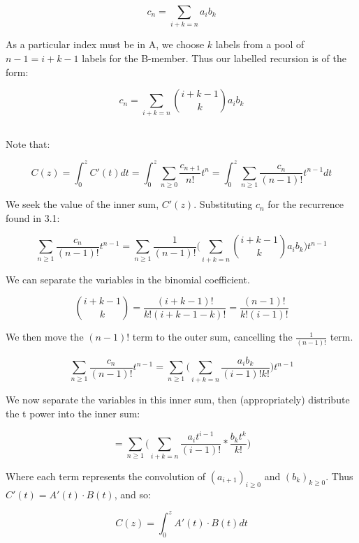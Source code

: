 \documentclass{article}
\begin{document}
$$c_n = \sum_{i + k = n} a_ib_k$$

As a particular index must be in A, we choose $k$ labels from a pool of $n-1 = i + k - 1$ labels for the B-member. Thus our labelled recursion is of the form:

$$c_n = \sum_{i + k = n} \binom{i + k - 1}{k}a_ib_k$$

\subsection{}

Note that:

$$C(z) =  \int_{0}^{z} C'(t) dt = \int_{0}^{z} \sum_{n \ge 0} \frac{c_{n+1}}{n!}t^{n}  = \int_{0}^{z} \sum_{n \ge 1} \frac{c_n}{(n-1)!}t^{n-1}  dt$$ 

We seek the value of the inner sum, $C'(z)$. Substituting $c_n$ for the recurrence found in 3.1:

$$\sum_{n \ge 1}\frac{c_n}{(n-1)!}t^{n-1}  = \sum_{n \ge 1}\frac{1}{(n-1)!} \bigg( \sum_{i + k = n} \binom{i + k - 1}{k}a_ib_k\bigg)t^{n-1}$$

We can separate the variables in the binomial coefficient.

$$\binom{i + k - 1}{k} = \frac{(i+k-1)!}{k!(i + k - 1 - k)!} = \frac{(n-1)!}{k!(i-1)!} $$

We then move the $(n-1)!$ term to the outer sum, cancelling the $\frac{1}{(n-1)!}$ term.

$$\sum_{n \ge 1}\frac{c_n}{(n-1)!}t^{n-1}  = \sum_{n \ge 1} \bigg( \sum_{i + k = n} \frac{a_ib_k}{(i-1)!k!}\bigg)t^{n-1}$$

We now separate the variables in this inner sum, then (appropriately) distribute the t power into the inner sum:

$$ = \sum_{n \ge 1} \bigg( \sum_{i + k = n} \frac{a_it^{i-1}}{(i-1)!} * \frac{b_kt^k}{k!}\bigg)$$

Where each term represents the convolution of $(a_{i+1})_{i \ge 0}$ and $(b_{k})_{k \ge 0}$. Thus $C'(t) = A'(t) \cdot B(t)$, and so:

$$C(z) = \int_{0}^{z} A'(t) \cdot B(t) dt$$
\end{document}
